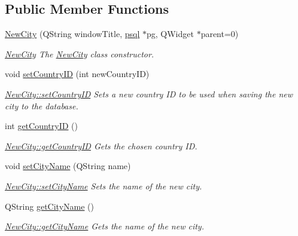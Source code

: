 \subsection*{Public Member Functions}
\begin{DoxyCompactItemize}
\item 
\hyperlink{class_new_city_a8b626e1fe480368bc7c2f819c1de6a19}{New\+City} (Q\+String window\+Title, \hyperlink{classpsql}{psql} $\ast$pg, Q\+Widget $\ast$parent=0)
\begin{DoxyCompactList}\small\item\em \hyperlink{class_new_city}{New\+City} The \hyperlink{class_new_city}{New\+City} class constructor. \end{DoxyCompactList}\item 
void \hyperlink{class_new_city_a8a96f2c58640c96faf74e1f3bb956e4e}{set\+Country\+ID} (int new\+Country\+ID)
\begin{DoxyCompactList}\small\item\em \hyperlink{class_new_city_a8a96f2c58640c96faf74e1f3bb956e4e}{New\+City\+::set\+Country\+ID} Sets a new country ID to be used when saving the new city to the database. \end{DoxyCompactList}\item 
int \hyperlink{class_new_city_a743baefdc6604f1bf8da124056939b0c}{get\+Country\+ID} ()
\begin{DoxyCompactList}\small\item\em \hyperlink{class_new_city_a743baefdc6604f1bf8da124056939b0c}{New\+City\+::get\+Country\+ID} Gets the chosen country ID. \end{DoxyCompactList}\item 
void \hyperlink{class_new_city_afe093fcb1aa6623e896c52ea35ff0481}{set\+City\+Name} (Q\+String name)
\begin{DoxyCompactList}\small\item\em \hyperlink{class_new_city_afe093fcb1aa6623e896c52ea35ff0481}{New\+City\+::set\+City\+Name} Sets the name of the new city. \end{DoxyCompactList}\item 
Q\+String \hyperlink{class_new_city_a3be62538974fa100134d694546608877}{get\+City\+Name} ()
\begin{DoxyCompactList}\small\item\em \hyperlink{class_new_city_a3be62538974fa100134d694546608877}{New\+City\+::get\+City\+Name} Gets the name of the new city. \end{DoxyCompactList}\end{DoxyCompactItemize}


